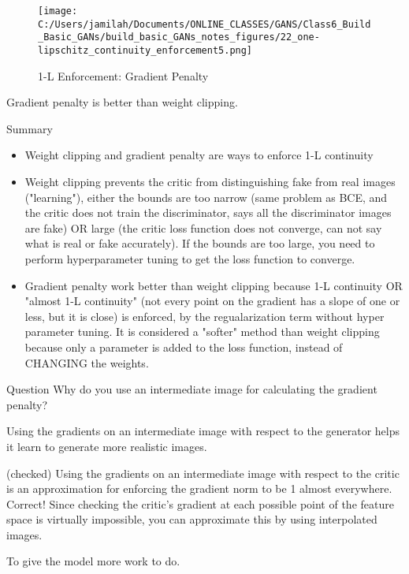\documentclass[11pt, onecolumn]{article}
\begin{document}
\begin{figure}[htp]
\begin{center}
\texttt{[image: C:/Users/jamilah/Documents/ONLINE\_CLASSES/GANS/Class6\_Build\_Basic\_GANs/build\_basic\_GANs\_notes\_figures/22\_one-lipschitz\_continuity\_enforcement5.png]}
\end{center}
\caption{1-L Enforcement: Gradient Penalty}
\label{22_one-lipschitz_continuity_enforcement5}
\end{figure}

Gradient penalty is better than weight clipping.

Summary
\begin{itemize}
\item Weight clipping and gradient penalty are ways to enforce 1-L continuity
\item Weight clipping prevents the critic from distinguishing fake from real images ("learning"), either the bounds are too narrow (same problem as BCE, and the critic does not train the discriminator, says all the discriminator images are fake) OR large (the critic loss function does not converge, can not say what is real or fake accurately).  If the bounds are too large, you need to perform hyperparameter tuning to get the loss function to converge.
\item Gradient penalty work better than weight clipping because 1-L continuity OR "almost 1-L continuity" (not every point on the gradient has a slope of one or less, but it is close) is enforced, by the regualarization term without hyper parameter tuning. It is considered a "softer" method than weight clipping because only a parameter is added to the loss function, instead of CHANGING the weights.
\end{itemize}

Question
Why do you use an intermediate image for calculating the gradient penalty?

Using the gradients on an intermediate image with respect to the generator helps it learn to generate more realistic images.

(checked) Using the gradients on an intermediate image with respect to the critic is an approximation for enforcing the gradient norm to be 1 almost everywhere.
Correct! Since checking the critic’s gradient at each possible point of the feature space is virtually impossible, you can approximate this by using interpolated images.

To give the model more work to do.
\end{document}
